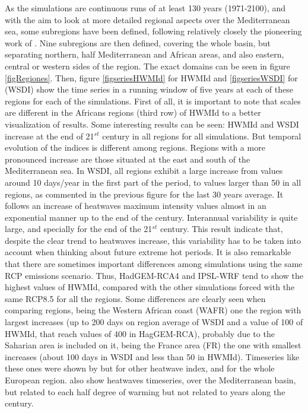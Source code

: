 As the simulations are continuous runs of at least 130 years (1971-2100), and with the
aim to look at more detailed regional aspects over the Mediterranean sea, some
subregions have been defined, following relatively closely
the pioneering work of \cite{gio_lio2008}. Nine subregions are then defined, covering
the whole basin, but separating northern, half Mediterranean and African areas,
and also eastern, central or western sides of the region. The exact domains can be
seen in figure \ref{figRegiones}. Then, figure \ref{figseriesHWMId} for HWMId and
\ref{figseriesWSDI} for (WSDI) show the time series in a running window of five years
at each of these regions for each of the simulations.
First of all, it is important to note that scales are different in the Africans
regions (third row) of HWMId to a better visualization of results. Some interesting
results can be seen: HWMId and WSDI increase at the end of 21$^{st}$ century in all
regions for all simulations. But temporal evolution of the indices is different among
regions. Regions with a more pronounced increase are those situated at the east and
south of the Mediterranean sea. In WSDI, all regions exhibit a large increase from
values around 10 days/year in the first part of the period, to values larger than 50
in all regions, as commented in the previous figure for
the last 30 years average. It follows an increase of heatwaves maximum intensity values almost in an exponential
manner up to the end of the century. 
Interannual variability is quite large, and specially for the end of the 21$^{st}$
century. This result indicate that, despite the clear trend to heatwaves increase,
this variability has to be taken into account when thinking about
future extreme hot periods. It is also remarkable that there are
sometimes important differences among simulations using the same
RCP emissions scenario. Thus, HadGEM-RCA4 and IPSL-WRF
tend to show the highest values of HWMId, compared with the other 
simulations forced with the same RCP8.5 for all the regions. 
Some differences are clearly seen when comparing regions,
being the Western African coast (WAFR) one the region with largest
increases (up to 200 days on region average of WSDI and a value of 100 of HWMId, that reach values of 400 in HagGEM-RCA), probably due to the 
Saharian area is included on it, 
being the France area (FR)
the one with smallest increases (about 100 days in WSDI and less than 50 in HWMId). 
Timeseries like these ones were shown by \cite{rus_al2014} but for other
heatwave index, and for the whole European region. \cite{per_gib2017}
also show heatwaves timeseries, over the Mediterranean basin,
but related to each half degree of warming but not related to
years along the century.


